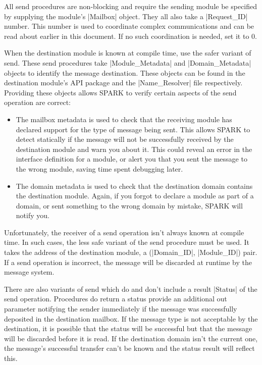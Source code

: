 All send procedures are non-blocking and require the sending module be specified by supplying
the module's |Mailbox| object. They all also take a |Request_ID| number. This number is used to
coordinate complex communications and can be read about earlier in this document. If no such
coordination is needed, set it to 0.

When the destination module is known at compile time, use the safer variant of send. These send
procedures take |Module_Metadata| and |Domain_Metadata| objects to identify the message
destination. These objects can be found in the destination module's API package and the
|Name_Resolver| file respectively. Providing these objects allows SPARK to verify certain
aspects of the send operation are correct:

\begin{itemize}
\item The mailbox metadata is used to check that the receiving module has declared support for
the type of message being sent. This allows SPARK to detect statically if the message will not
be successfully received by the destination module and warn you about it. This could reveal an
error in the interface definition for a module, or alert you that you sent the message to the
wrong module, saving time spent debugging later.

\item The domain metadata is used to check that the destination domain contains the destination
module. Again, if you forgot to declare a module as part of a domain, or sent something to the
wrong domain by mistake, SPARK will notify you.
\end{itemize}

Unfortunately, the receiver of a send operation isn't always known at compile time. In such
cases, the less safe variant of the send procedure must be used. It takes the address of the
destination module, a (|Domain_ID|, |Module_ID|) pair. If a send operation is incorrect, the
message will be discarded at runtime by the message system.

There are also variants of send which do and don't include a result |Status| of the send
operation. Procedures do return a status provide an additional out parameter notifying the
sender immediately if the message was successfully deposited in the destination mailbox. If the
message type is not acceptable by the destination, it is possible that the status will be
successful but that the message will be discarded before it is read. If the destination domain
isn't the current one, the message's successful transfer can't be known and the status result
will reflect this.


